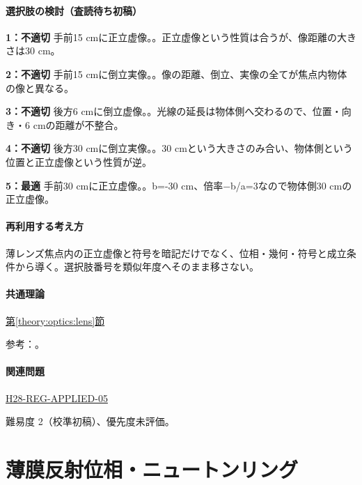 \paragraph{選択肢の検討（査読待ち初稿）}\mbox{}\par

\noindent\textbf{1：不適切} 手前15 cmに正立虚像。。正立虚像という性質は合うが、像距離の大きさは30 cm。\par

\noindent\textbf{2：不適切} 手前15 cmに倒立実像。。像の距離、倒立、実像の全てが焦点内物体の像と異なる。\par

\noindent\textbf{3：不適切} 後方6 cmに倒立虚像。。光線の延長は物体側へ交わるので、位置・向き・6 cmの距離が不整合。\par

\noindent\textbf{4：不適切} 後方30 cmに倒立実像。。30 cmという大きさのみ合い、物体側という位置と正立虚像という性質が逆。\par

\noindent\textbf{5：最適} 手前30 cmに正立虚像。。b=-30 cm、倍率−b/a=\allowbreak{}3なので物体側30 cmの正立虚像。\par

\paragraph{再利用する考え方} 薄レンズ焦点内の正立虚像と符号を暗記だけでなく、位相・幾何・符号と成立条件から導く。選択肢番号を類似年度へそのまま移さない。

\paragraph{共通理論} \hyperref[theory:optics:lens]{第\ref*{theory:optics:lens}節}

\par 参考：\cite{os_lens}。

\paragraph{関連問題} \hyperref[q:h28-reg-applied-05]{H28-REG-APPLIED-05}

\par 難易度 2（校準初稿）、優先度未評価。

\section{薄膜反射位相・ニュートンリング}

